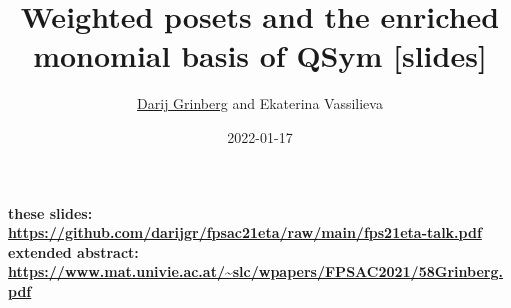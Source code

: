 \documentclass[numbers=enddot,12pt,final,onecolumn,notitlepage]{scrartcl}%
\newcommand{\0}{\phantom{c}}
\begin{document}
\title{Weighted posets and the enriched monomial basis of QSym [slides]}
\author{\href{http://www.cip.ifi.lmu.de/~grinberg/}{Darij Grinberg} and Ekaterina Vassilieva}
\date{2022-01-17}
\maketitle

\noindent \textbf{these slides: \\ \phantom{a}\quad \color{red}
\url{https://github.com/darijgr/fpsac21eta/raw/main/fps21eta-talk.pdf}}%
\newline\textbf{extended abstract: \\ \phantom{a}\quad \color{red}
\url{https://www.mat.univie.ac.at/~slc/wpapers/FPSAC2021/58Grinberg.pdf}}%
\newline
\end{document}

